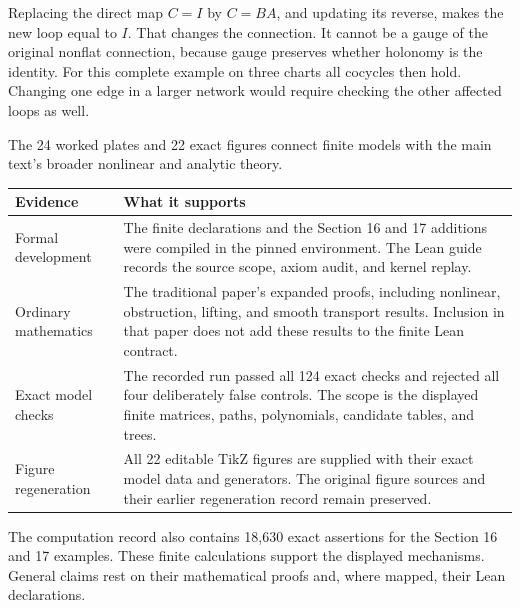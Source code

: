 Replacing the direct map $C=I$ by $C=BA$, and updating its reverse, makes the new loop equal to $I$. That changes the connection. It cannot be a gauge of the original nonflat connection, because gauge preserves whether holonomy is the identity. For this complete example on three charts all cocycles then hold. Changing one edge in a larger network would require checking the other affected loops as well.


The 24 worked plates and 22 exact figures connect finite models with the main text's broader nonlinear and analytic theory.

{\small
\begin{tabularx}{\linewidth}{@{}p{.24\linewidth}Y@{}}\toprule
\textbf{Evidence} & \textbf{What it supports}\\\midrule
Formal development & The finite declarations and the Section 16 and 17 additions were compiled in the pinned environment. The Lean guide records the source scope, axiom audit, and kernel replay.\\
Ordinary mathematics & The traditional paper's expanded proofs, including nonlinear, obstruction, lifting, and smooth transport results. Inclusion in that paper does not add these results to the finite Lean contract.\\
Exact model checks & The recorded run passed all 124 exact checks and rejected all four deliberately false controls. The scope is the displayed finite matrices, paths, polynomials, candidate tables, and trees.\\
Figure regeneration & All 22 editable TikZ figures are supplied with their exact model data and generators. The original figure sources and their earlier regeneration record remain preserved.\\\bottomrule
\end{tabularx}}

The computation record also contains 18,630 exact assertions for the Section 16 and 17 examples. These finite calculations support the displayed mechanisms. General claims rest on their mathematical proofs and, where mapped, their Lean declarations.

